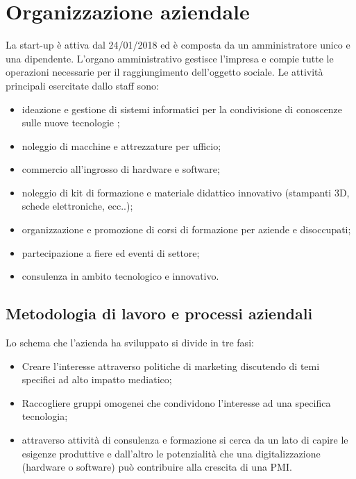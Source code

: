 \section{Organizzazione aziendale}
La start-up è attiva dal 24/01/2018 ed è composta da un amministratore unico e una dipendente.
L'organo amministrativo gestisce l'impresa e compie tutte le operazioni necessarie per il raggiungimento dell'oggetto sociale.
Le attività principali esercitate dallo staff sono:
\begin{itemize}
\item ideazione e gestione di sistemi informatici per la condivisione di conoscenze sulle nuove tecnologie ;
\item noleggio di macchine e attrezzature per ufficio;
\item commercio all'ingrosso di hardware e software;
\item noleggio di kit di formazione e materiale didattico innovativo (stampanti 3D, schede elettroniche, ecc..);
\item organizzazione e promozione di corsi di formazione per aziende e disoccupati;
\item partecipazione a fiere ed eventi di settore;
\item consulenza in ambito tecnologico e innovativo.
\end{itemize}
\subsection{Metodologia di lavoro e processi aziendali}
Lo schema che l'azienda ha sviluppato si divide in tre fasi:
\begin{itemize}
\item Creare l’interesse attraverso politiche di marketing discutendo di temi specifici ad alto impatto mediatico;
\item Raccogliere gruppi omogenei che condividono l'interesse ad una specifica tecnologia;
\item attraverso attività di consulenza e formazione si cerca da un lato di capire le esigenze produttive e dall’altro le potenzialità che una digitalizzazione (hardware o software) può contribuire alla crescita di una PMI.
\end{itemize}

